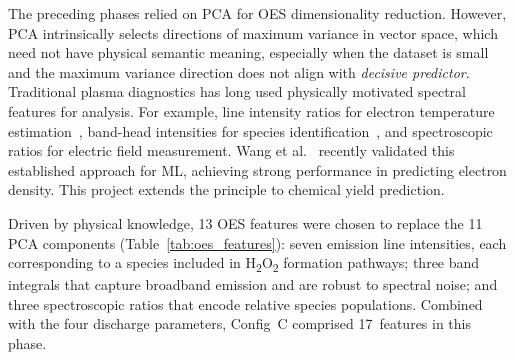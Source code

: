 \documentclass[12pt, a4paper]{article}
\begin{document}
The preceding phases relied on PCA for OES dimensionality reduction. However, PCA intrinsically selects directions of maximum variance in vector space, which need not have physical semantic meaning, especially when the dataset is small and the maximum variance direction does not align with \emph{decisive predictor}. Traditional plasma diagnostics has long used physically motivated spectral features for analysis. For example, line intensity ratios for electron temperature estimation~\cite{Laux2003OESAir}, band-head intensities for species identification~\cite{Paris2005N2Ratio}, and spectroscopic ratios for electric field measurement. Wang et al.~\cite{Wang2025MLOESCascaded} recently validated this established approach for ML, achieving strong performance in predicting electron density. This project extends the principle to chemical yield prediction.

Driven by physical knowledge, 13 OES features were chosen to replace the 11 PCA components (Table~\ref{tab:oes_features}): seven emission line intensities, each corresponding to a species included in H\textsubscript{2}O\textsubscript{2} formation pathways; three band integrals that capture broadband emission and are robust to spectral noise; and three spectroscopic ratios that encode relative species populations. Combined with the four discharge parameters, Config~C comprised 17~features in this phase.
\end{document}
